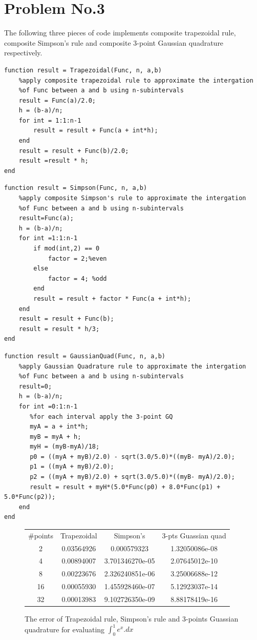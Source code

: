 \section*{Problem No.3} \label{sec:prob3}

The following three pieces of code implements composite trapezoidal rule, composite Simpson's rule and composite 3-point Gaussian quadrature respectively. 
\begin{lstlisting}
function result = Trapezoidal(Func, n, a,b)
    %apply composite trapezoidal rule to approximate the intergation 
    %of Func between a and b using n-subintervals 
    result = Func(a)/2.0;
    h = (b-a)/n;
    for int = 1:1:n-1
        result = result + Func(a + int*h);
    end
    result = result + Func(b)/2.0;
    result =result * h;
end
\end{lstlisting}


\begin{lstlisting}
function result = Simpson(Func, n, a,b)
    %apply composite Simpson's rule to approximate the intergation 
    %of Func between a and b using n-subintervals 
    result=Func(a);
    h = (b-a)/n;
    for int =1:1:n-1
        if mod(int,2) == 0
            factor = 2;%even
        else
            factor = 4; %odd
        end
        result = result + factor * Func(a + int*h);
    end
    result = result + Func(b);
    result = result * h/3;
end
\end{lstlisting}


\begin{lstlisting}
function result = GaussianQuad(Func, n, a,b)
    %apply Gaussian Quadrature rule to approximate the intergation 
    %of Func between a and b using n-subintervals 
    result=0;    
    h = (b-a)/n;
    for int =0:1:n-1
       %for each interval apply the 3-point GQ
       myA = a + int*h;
       myB = myA + h;       
       myH = (myB-myA)/18;       
       p0 = ((myA + myB)/2.0) - sqrt(3.0/5.0)*((myB- myA)/2.0);
       p1 = ((myA + myB)/2.0);
       p2 = ((myA + myB)/2.0) + sqrt(3.0/5.0)*((myB- myA)/2.0);       
       result = result + myH*(5.0*Func(p0) + 8.0*Func(p1) + 5.0*Func(p2));       
    end
end
\end{lstlisting}


\begin{figure}[H]
 \centering
\begin{tabular}{ |c || c|c|c |}
 \hline
\#points  & Trapezoidal & Simpson's & 3-pts Guassian quad \\   	
  \hhline{|=|=|=|=|}                           
2  & 0.03564926 & 0.000579323     &	1.32050086e-08 \\
4  & 0.00894007 & 3.701346270e-05 &	2.07645012e-10 \\ 
8  & 0.00223676 & 2.326240851e-06 &	3.25006688e-12 \\
16 & 0.00055930 & 1.455928460e-07 &	5.12923037e-14 \\
32 & 0.00013983 & 9.102726350e-09 &	8.88178419e-16 \\
 \hline
\end{tabular} 
  \caption{The error of Trapezoidal rule, Simpson's rule and 3-points Guassian quadrature for evaluating $\int^{1}_{0}e^{x}.dx$ }
   \label{tab:err}
\end{figure}

